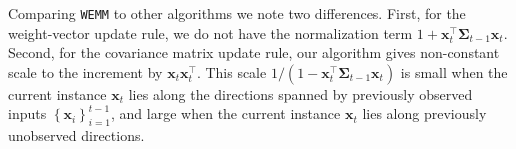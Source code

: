 Comparing \texttt{WEMM} to other algorithms we note two
differences. First, for the weight-vector update rule, we do not have the normalization term $1+\mathbf{x}_{t}^{\top}\mathbf{\Sigma}_{t-1}\mathbf{x}_{t}$. Second, for the covariance matrix update rule, our algorithm gives non-constant scale to the increment by $\mathbf{x}_{t}\mathbf{x}_{t}^{\top}$. This scale $1/(1-\mathbf{x}_{t}^{\top}\mathbf{\Sigma}_{t-1}\mathbf{x}_{t})$ is small when the current instance $\mathbf{x}_{t}$ lies along the directions spanned by previously observed inputs $\left\{ \mathbf{x}_{i}\right\} _{i=1}^{t-1}$, and large when the current instance $\mathbf{x}_{t}$ lies along previously unobserved directions.




